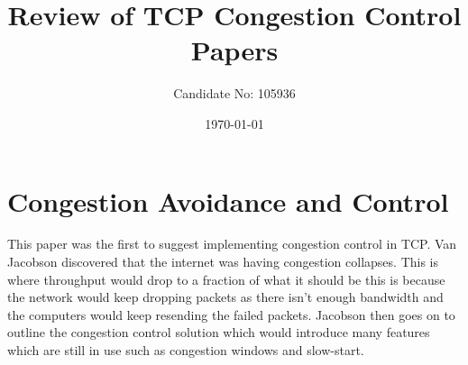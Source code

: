 \documentclass[a4paper,12pt]{scrartcl}
\title{Review of TCP Congestion Control Papers}
\author{Candidate No: 105936}
\date{\today}
\begin{document}
	
	\begin{titlepage}
		\maketitle
	\end{titlepage}
	
	\tableofcontents
	\newpage
	
	\section{Congestion Avoidance and Control\cite{JacobsonCongestAvoidanceControlArticle}}
	{
		This paper was the first to suggest implementing congestion control in TCP. Van Jacobson discovered that the internet was having congestion collapses. This is where throughput would drop to a fraction of what it should be this is because the network would keep dropping packets as there isn't enough bandwidth and the computers would keep resending the failed packets. Jacobson then goes on to outline the congestion control solution which would introduce many features which are still in use such as congestion windows and slow-start.
	}
\end{document}
